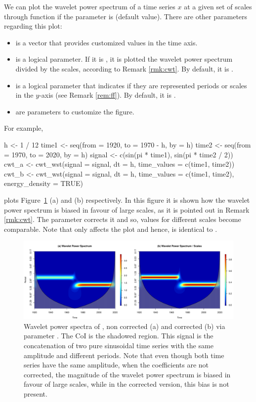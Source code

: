 We can plot the wavelet power spectrum of a time series $x$ at a given set of scales through function  if the parameter  is  (default value). There are other parameters regarding this plot:
\begin{itemize}
\item {} is a vector that provides customized values in the time axis.
\item {} is a logical parameter. If it is , it is plotted the wavelet power spectrum divided by the scales, according to Remark \ref{rmk:cwt}. By default, it is .
\item {} is a logical parameter that indicates if they are represented periods or scales in the $y$-axis (see Remark \ref{rem:ff}). By default, it is .
\item {} are parameters to customize the figure.
\end{itemize}
For example,
\begin{example}
h <- 1 / 12
time1 <- seq(from = 1920, to = 1970 - h, by = h)
time2 <- seq(from = 1970, to = 2020, by = h)
signal <- c(sin(pi * time1), sin(pi * time2 / 2))
cwt_a <- cwt_wst(signal = signal, dt = h, time_values = c(time1, time2))
cwt_b <- cwt_wst(signal = signal, dt = h, time_values = c(time1, time2),
                 energy_density = TRUE)
\end{example}
plots Figure~\ref{fig:wps} (a) and (b) respectively. In this figure it is shown how the wavelet power spectrum is biased in favour of large scales, as it is pointed out in Remark \ref{rmk:cwt}. The parameter  corrects it and so, values for different scales become comparable. Note that  only affects the plot and hence,  is identical to .

\begin{figure}[tbp]
\begin{center}
  \includegraphics[width=1\textwidth]{Figure3}
\end{center}
\caption{Wavelet power spectra of , non corrected (a) and corrected (b) via parameter . The CoI is the shadowed region. This signal is the concatenation of two pure sinusoidal time series with the same amplitude and different periods. Note that even though both time series have the same amplitude, when the coefficients are not corrected, the magnitude of the wavelet power spectrum is biased in favour of large scales, while in the corrected version, this bias is not present.}
\label{fig:wps}
\end{figure}

